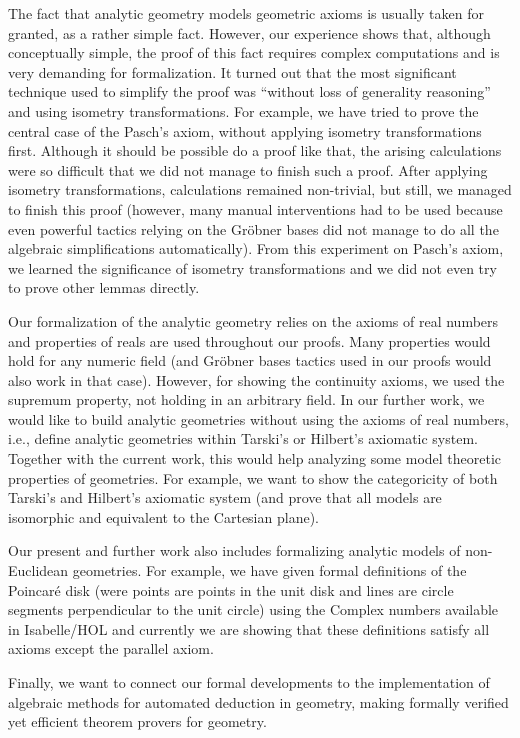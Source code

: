 The fact that analytic geometry models geometric axioms is usually
taken for granted, as a rather simple fact. However, our experience
shows that, although conceptually simple, the proof of this fact
requires complex computations and is very demanding for
formalization. It turned out that the most significant technique used
to simplify the proof was ``without loss of generality reasoning'' and
using isometry transformations. For example, we have tried to prove
the central case of the Pasch's axiom, without applying isometry
transformations first. Although it should be possible do a proof like
that, the arising calculations were so difficult that we did not
manage to finish such a proof. After applying isometry
transformations, calculations remained non-trivial, but still, we
managed to finish this proof (however, many manual interventions had
to be used because even powerful tactics relying on the Gr\"obner
bases did not manage to do all the algebraic simplifications
automatically). From this experiment on Pasch's axiom, we learned the
significance of isometry transformations and we did not even try to
prove other lemmas directly.

Our formalization of the analytic geometry relies on the axioms of
real numbers and properties of reals are used throughout our
proofs. Many properties would hold for any numeric field (and
Gr\"obner bases tactics used in our proofs would also work in that
case). However, for showing the continuity axioms, we used the
supremum property, not holding in an arbitrary field. In our further
work, we would like to build analytic geometries without using the
axioms of real numbers, i.e., define analytic geometries within
Tarski's or Hilbert's axiomatic system. Together with the current
work, this would help analyzing some model theoretic properties of
geometries. For example, we want to show the categoricity of both
Tarski's and Hilbert's axiomatic system (and prove that all models are
isomorphic and equivalent to the Cartesian plane).

Our present and further work also includes formalizing analytic models
of non-Euclidean geometries. For example, we have given formal
definitions of the Poincar\'e disk (were points are points in the unit
disk and lines are circle segments perpendicular to the unit circle)
using the Complex numbers available in Isabelle/HOL and currently we
are showing that these definitions satisfy all axioms except the
parallel axiom.

Finally, we want to connect our formal developments to the
implementation of algebraic methods for automated deduction in
geometry, making formally verified yet efficient theorem provers for
geometry.

